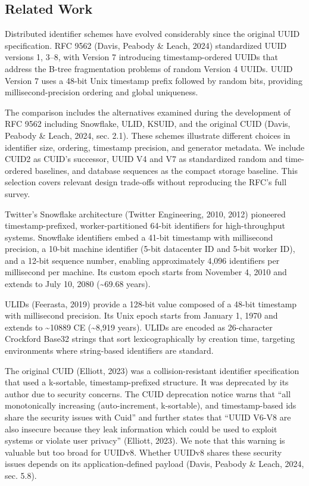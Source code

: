 \documentclass[fleqn,10pt]{wlpeerj}
\begin{document}
\subsection{Related Work}\label{related-work}

Distributed identifier schemes have evolved considerably since the
original UUID specification. RFC 9562 (Davis, Peabody \& Leach, 2024)
standardized UUID versions 1, 3--8, with Version 7 introducing
timestamp-ordered UUIDs that address the B-tree fragmentation problems
of random Version 4 UUIDs. UUID Version 7 uses a 48-bit Unix timestamp
prefix followed by random bits, providing millisecond-precision ordering
and global uniqueness.

The comparison includes the alternatives examined during the development
of RFC 9562 including Snowflake, ULID, KSUID, and the original CUID
(Davis, Peabody \& Leach, 2024, sec. 2.1). These schemes illustrate
different choices in identifier size, ordering, timestamp precision, and
generator metadata. We include CUID2 as CUID's successor, UUID V4 and V7
as standardized random and time-ordered baselines, and database
sequences as the compact storage baseline. This selection covers
relevant design trade-offs without reproducing the RFC's full survey.

Twitter's Snowflake architecture (Twitter Engineering, 2010, 2012)
pioneered timestamp-prefixed, worker-partitioned 64-bit identifiers for
high-throughput systems. Snowflake identifiers embed a 41-bit timestamp
with millisecond precision, a 10-bit machine identifier (5-bit
datacenter ID and 5-bit worker ID), and a 12-bit sequence number,
enabling approximately 4,096 identifiers per millisecond per machine.
Its custom epoch starts from November 4, 2010 and extends to July 10,
2080 (\textasciitilde69.68 years).

ULIDs (Feerasta, 2019) provide a 128-bit value composed of a 48-bit
timestamp with millisecond precision. Its Unix epoch starts from January
1, 1970 and extends to \textasciitilde10889 CE (\textasciitilde8,919
years). ULIDs are encoded as 26-character Crockford Base32 strings that
sort lexicographically by creation time, targeting environments where
string-based identifiers are standard.

The original CUID (Elliott, 2023) was a collision-resistant identifier
specification that used a k-sortable, timestamp-prefixed structure. It
was deprecated by its author due to security concerns. The CUID
deprecation notice warns that ``all monotonically increasing
(auto-increment, k-sortable), and timestamp-based ids share the security
issues with Cuid'' and further states that ``UUID V6-V8 are also
insecure because they leak information which could be used to exploit
systems or violate user privacy'' (Elliott, 2023). We note that this
warning is valuable but too broad for UUIDv8. Whether UUIDv8 shares
these security issues depends on its application-defined payload (Davis,
Peabody \& Leach, 2024, sec. 5.8).
\end{document}
